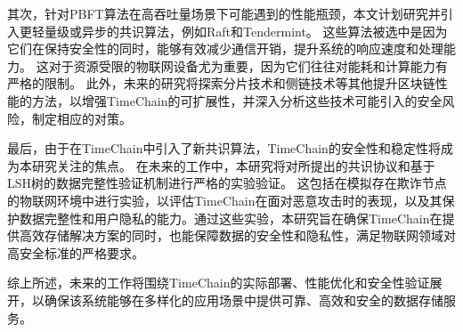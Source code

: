 其次，针对PBFT算法在高吞吐量场景下可能遇到的性能瓶颈，本文计划研究并引入更轻量级或异步的共识算法，例如Raft和Tendermint。
这些算法被选中是因为它们在保持安全性的同时，能够有效减少通信开销，提升系统的响应速度和处理能力。
这对于资源受限的物联网设备尤为重要，因为它们往往对能耗和计算能力有严格的限制。
此外，未来的研究将探索分片技术和侧链技术等其他提升区块链性能的方法，以增强TimeChain的可扩展性，并深入分析这些技术可能引入的安全风险，制定相应的对策。

最后，由于在TimeChain中引入了新共识算法，TimeChain的安全性和稳定性将成为本研究关注的焦点。
在未来的工作中，本研究将对所提出的共识协议和基于LSH树的数据完整性验证机制进行严格的实验验证。
这包括在模拟存在欺诈节点的物联网环境中进行实验，以评估TimeChain在面对恶意攻击时的表现，以及其保护数据完整性和用户隐私的能力。通过这些实验，本研究旨在确保TimeChain在提供高效存储解决方案的同时，也能保障数据的安全性和隐私性，满足物联网领域对高安全标准的严格要求。

综上所述，未来的工作将围绕TimeChain的实际部署、性能优化和安全性验证展开，以确保该系统能够在多样化的应用场景中提供可靠、高效和安全的数据存储服务。
